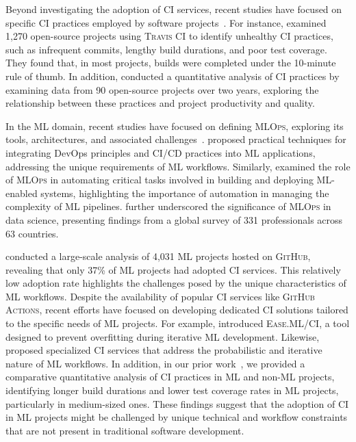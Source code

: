 Beyond investigating the adoption of CI services, recent studies have focused on specific CI practices employed by software projects~\citep{felidre2019continuous, santos2022investigating}. For instance, \cite{felidre2019continuous} examined 1,270 open-source projects using \textsc{Travis CI} to identify unhealthy CI practices, such as infrequent commits, lengthy build durations, and poor test coverage. They found that, in most projects, builds were completed under the 10-minute rule of thumb. In addition, \cite{santos2022investigating} conducted a quantitative analysis of CI practices by examining data from 90 open-source projects over two years, exploring the relationship between these practices and project productivity and quality.

In the ML domain, recent studies have focused on defining \textsc{MLOps}, exploring its tools, architectures, and associated challenges~\citep{alla2021mlops, symeonidis2022mlops, kreuzberger2023machine}. \cite{karamitsos2020applying} proposed practical techniques for integrating DevOps principles and CI/CD practices into ML applications, addressing the unique requirements of ML workflows. Similarly, \cite{calefato2022preliminary} examined the role of \textsc{MLOps} in automating critical tasks involved in building and deploying ML-enabled systems, highlighting the importance of automation in managing the complexity of ML pipelines. \cite{makinen2021needs} further underscored the significance of \textsc{MLOps} in data science, presenting findings from a global survey of 331 professionals across 63 countries.

\cite{rzig2022characterizing} conducted a large-scale analysis of 4,031 ML projects hosted on \textsc{GitHub}, revealing that only 37\% of ML projects had adopted CI services. This relatively low adoption rate highlights the challenges posed by the unique characteristics of ML workflows. Despite the availability of popular CI services like \textsc{GitHub Actions}, recent efforts have focused on developing dedicated CI solutions tailored to the specific needs of ML projects. For example, \cite{renggli2019continuous} introduced \textsc{Ease.ML/CI}, a tool designed to prevent overfitting during iterative ML development. Likewise, \cite{karlavs2020building} proposed specialized CI services that address the probabilistic and iterative nature of ML workflows.
In addition, in our prior work~\citep{bernardo2024machine}, we provided a comparative quantitative analysis of CI practices in ML and non-ML projects, identifying longer build durations and lower test coverage rates in ML projects, particularly in medium-sized ones. 
These findings suggest that the adoption of CI in ML projects might be challenged by unique technical and workflow constraints that are not present in traditional software development.


